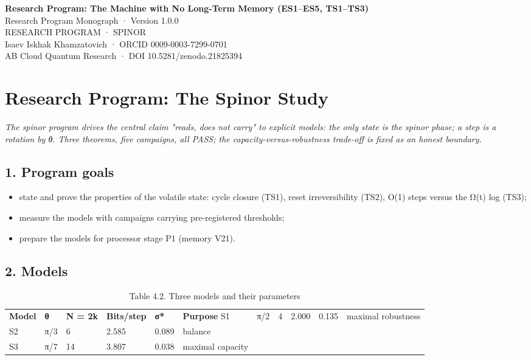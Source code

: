 \documentclass[11pt,a4paper]{article}
\begin{document}
\begin{center}
{\LARGE\bfseries Research Program: The Machine with No Long-Term Memory (ES1–ES5, TS1–TS3)}\\[8pt]
{\large Research Program Monograph · Version 1.0.0}\\[6pt]
{\color{copper}\small RESEARCH PROGRAM · SPINOR}\\[4pt]
{\small Isaev Iskhak Khamzatovich · ORCID 0009-0003-7299-0701}\\[2pt]
{\small AB Cloud Quantum Research · DOI 10.5281/zenodo.21825394}
\end{center}

\tableofcontents
\newpage

\section{Research Program: The Spinor Study}

\noindent\textit{\color{copper}The spinor program drives the central claim "reads, does not carry" to explicit models: the only state is the spinor phase; a step is a rotation by θ. Three theorems, five campaigns, all PASS; the capacity-versus-robustness trade-off is fixed as an honest boundary.}

\subsection{1. Program goals}

\begin{itemize}
  \item state and prove the properties of the volatile state: cycle closure (TS1), reset irreversibility (TS2), O(1) steps versus the Ω(t) log (TS3);
  \item measure the models with campaigns carrying pre-registered thresholds;
  \item prepare the models for processor stage P1 (memory V21).
\end{itemize}

\subsection{2. Models}

\begin{table}[htbp]\centering\small
\caption{Table 4.2. Three models and their parameters}
\begin{tabular}{p{} p{} p{} p{} p{} p{}}
\toprule
\textbf{Model} & \textbf{θ} & \textbf{N = 2k} & \textbf{Bits/step} & \textbf{σ*} & \textbf{Purpose}
\midrule
S1 & π/2 & 4 & 2.000 & 0.135 & maximal robustness \\
S2 & π/3 & 6 & 2.585 & 0.089 & balance \\
S3 & π/7 & 14 & 3.807 & 0.038 & maximal capacity \\
\bottomrule
\end{tabular}
\end{table}
\end{document}
